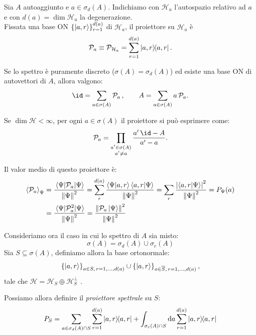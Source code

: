 Sia \(A\) autoaggiunto e \(a\in \sigma_d(A)\). Indichiamo con \(\mathcal{H}_a\) l'autospazio relativo ad \(a\) e con \(d(a)= \dim \mathcal{H}_a\) la degenerazione. \\
Fissata una base ON \(\{\ket{a,r}\}_{r=1}^{d(a)}\) di \(\mathcal{H}_a\), il proiettore su \(\mathcal{H}_a\) è
\begin{equation}
    \mathcal{P}_a \equiv \mathcal{P}_{\mathcal{H}_a}= \sum_{r=1}^{d(a)} \dyad{a,r}{a,r}.
\end{equation}
    

Se lo spettro è puramente discreto (\(\sigma(A)= \sigma_d(A)\)) ed esiste una base ON di autovettori di \(A\), allora valgono:
\begin{equation}
    \id= \sum_{a\in \sigma(A)} \mathcal{P}_a\,,\qquad
        A= \sum_{a\in \sigma(A)} a\,\mathcal{P}_a.
\end{equation}

Se \(\dim \mathcal{H} < \infty\), per ogni \(a\in \sigma(A)\) il proiettore si può esprimere come:
\[
    \mathcal{P}_a= \prod_{\substack{a'\in \sigma(A)\\ a'\neq a}} \frac{a'\,\id- A}{a'-a}.
\]



Il valor medio di questo proiettore è:
\begin{align}
    \expval{\mathcal{P}_a}_\Psi &= \frac{\expval{\mathcal{P}_a}{\Psi}}{\norm{\Psi}^2}= \sum_r^{d(a)} \frac{\braket{\Psi}{a,r}\braket{a,r}{\Psi}}{\norm{\Psi}^2} =
    \sum_r  \frac{\abs{\braket{a,r}{\Psi}}^2}{\norm{\Psi}^2}= P_\Psi(a)\\
    &= \frac{\expval{\mathcal{P}^2_a}{\Psi}}{\norm{\Psi}^2}= \frac {\norm{\mathcal{P}_a\ket{\Psi}}^2}{\norm{\Psi}^2}
\end{align}

Consideriamo ora il caso in cui lo spettro di \(A\) sia misto:
\[
\sigma(A) = \sigma_d(A) \cup \sigma_c(A)
\]
Sia \( S \subseteq \sigma(A) \), definiamo allora la base ortonormale:
\[
\left\{ \ket{a,r} \right\}_{a \in S,\, r=1,\dots,d(a)} \cup 
\left\{ \ket{a,r} \right\}_{a \in \overline{S},\, r=1,\dots,d(a)} ,
\]
tale che \(\mathcal{H} = \mathcal{H}_S \oplus \mathcal{H}_S^{\perp}\) .

Possiamo allora definire il \textit{proiettore spettrale} su \(S\):
\begin{equation}
    P_S = \sum_{a \in \sigma_d(A) \cap S} \sum_{r=1}^{d(a)} \dyad{a,r}{a,r} 
    + \int_{\sigma_c(A) \cap S} \dd{a} \sum_{r=1}^{d(a)} \dyad{a,r}{a,r}
\end{equation}

